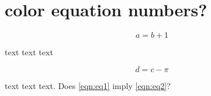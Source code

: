 \documentclass[openany]{memoir}
\newcommand{\HRule}[1]{\hfill \rule{0.2\linewidth}{#1}} %
\begin{document}

%
%
%		
%		
%
%
%
%
%
\section{color equation numbers?}

\ccbyncnd

\begin{equation}\label{eqn:eq1}
a = b + 1
\end{equation}

text text text

\begin{equation}\label{eqn:eq2}
d = c - \pi
\end{equation}

text text text.  Does \ref{eqn:eq1} imply \ref{eqn:eq2}?
\end{document}

